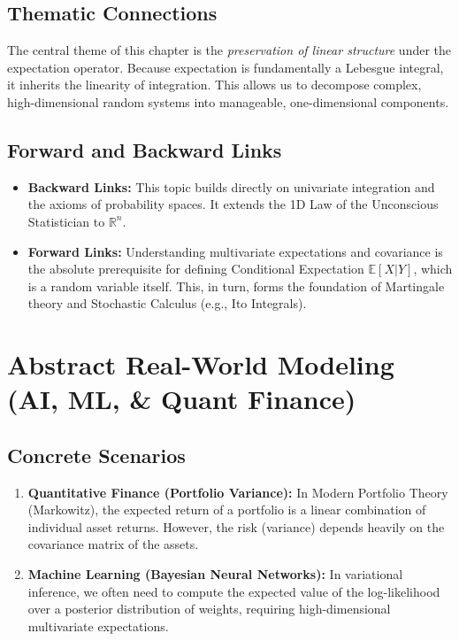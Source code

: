 \documentclass[11pt, a4paper]{article}
\theoremstyle{definition}
\theoremstyle{remark}
\newcommand{\R}{\mathbb{R}}
\newcommand{\E}{\mathbb{E}}
\begin{document}
\subsection{Thematic Connections}
The central theme of this chapter is the \textit{preservation of linear structure} under the expectation operator. Because expectation is fundamentally a Lebesgue integral, it inherits the linearity of integration. This allows us to decompose complex, high-dimensional random systems into manageable, one-dimensional components. 

\subsection{Forward and Backward Links}
\begin{itemize}
    \item \textbf{Backward Links:} This topic builds directly on univariate integration and the axioms of probability spaces. It extends the 1D Law of the Unconscious Statistician to $\R^n$.
    \item \textbf{Forward Links:} Understanding multivariate expectations and covariance is the absolute prerequisite for defining Conditional Expectation $\E[X|Y]$, which is a random variable itself. This, in turn, forms the foundation of Martingale theory and Stochastic Calculus (e.g., Ito Integrals).
\end{itemize}

\section{Abstract Real-World Modeling (AI, ML, \& Quant Finance)}

\subsection{Concrete Scenarios}
\begin{enumerate}
    \item \textbf{Quantitative Finance (Portfolio Variance):} In Modern Portfolio Theory (Markowitz), the expected return of a portfolio is a linear combination of individual asset returns. However, the risk (variance) depends heavily on the covariance matrix of the assets.
    \item \textbf{Machine Learning (Bayesian Neural Networks):} In variational inference, we often need to compute the expected value of the log-likelihood over a posterior distribution of weights, requiring high-dimensional multivariate expectations.
\end{enumerate}
\end{document}
